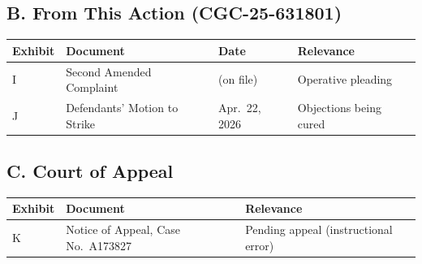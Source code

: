 \subsection{B. From This Action (CGC-25-631801)}\label{b.-from-this-action-cgc-25-631801}

{\def\LTcaptype{table} %
\begin{longtable}[]{@{}
  >{\raggedright\arraybackslash}p{}
  >{\raggedright\arraybackslash}p{}
  >{\raggedright\arraybackslash}p{}
  >{\raggedright\arraybackslash}p{}@{}}
\toprule\noalign{}
\begin{minipage}[b]{\linewidth}\raggedright
Exhibit
\end{minipage} & \begin{minipage}[b]{\linewidth}\raggedright
Document
\end{minipage} & \begin{minipage}[b]{\linewidth}\raggedright
Date
\end{minipage} & \begin{minipage}[b]{\linewidth}\raggedright
Relevance
\end{minipage} \\
\midrule\noalign{}
\endhead
\bottomrule\noalign{}
\endlastfoot
I & Second Amended Complaint & (on file) & Operative pleading \\
J & Defendants' Motion to Strike & Apr.~22, 2026 & Objections being cured \\
\end{longtable}
}

\subsection{C. Court of Appeal}\label{c.-court-of-appeal}

{\def\LTcaptype{table} %
\begin{longtable}[]{@{}
  >{\raggedright\arraybackslash}p{}
  >{\raggedright\arraybackslash}p{}
  >{\raggedright\arraybackslash}p{}@{}}
\toprule\noalign{}
\begin{minipage}[b]{\linewidth}\raggedright
Exhibit
\end{minipage} & \begin{minipage}[b]{\linewidth}\raggedright
Document
\end{minipage} & \begin{minipage}[b]{\linewidth}\raggedright
Relevance
\end{minipage} \\
\midrule\noalign{}
\endhead
\bottomrule\noalign{}
\endlastfoot
K & Notice of Appeal, Case No.~A173827 & Pending appeal (instructional error) \\
\end{longtable}
}


